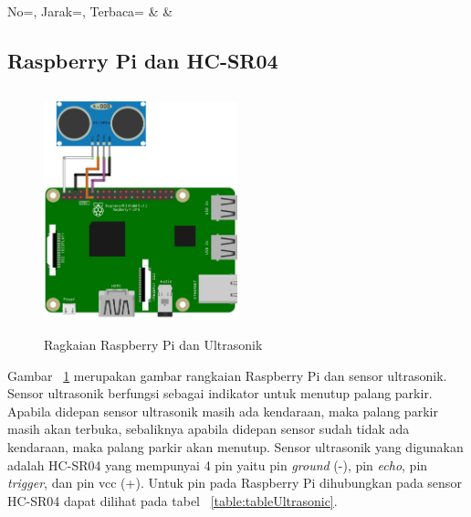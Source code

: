 \begin{atable}
    \caption{Hasil uji jarak baca RFID}
    \label{table:tableUjiRfid}
        {
            No=\No, 
            Jarak=\Jarak,
            Terbaca=\Terbaca}
        {
            \No & 
            \Jarak &
            \Terbaca}
\end{atable}

\subsection{Raspberry Pi dan HC-SR04}
\begin{figure} [H]
    \includegraphics[height=7cm, width=0.5\textwidth, center]{images/skematik_ultra.jpg}
    \caption{Ragkaian Raspberry Pi dan Ultrasonik}
    \label{fig:skematikUltrasonik}
\end{figure}

Gambar ~\ref{fig:skematikUltrasonik} merupakan gambar rangkaian Raspberry Pi dan sensor ultrasonik. Sensor ultrasonik berfungsi sebagai indikator untuk menutup palang parkir. Apabila didepan sensor ultrasonik masih ada kendaraan, maka palang parkir masih akan terbuka, sebaliknya apabila didepan sensor sudah tidak ada kendaraan, maka palang parkir akan menutup. Sensor ultrasonik yang digunakan adalah HC-SR04 yang mempunyai 4 pin yaitu pin \textit{ground} (-), pin \textit{echo}, pin \textit{trigger}, dan pin vcc (+). Untuk pin pada Raspberry Pi dihubungkan pada sensor HC-SR04 dapat dilihat pada tabel ~\ref{table:tableUltrasonic}.

